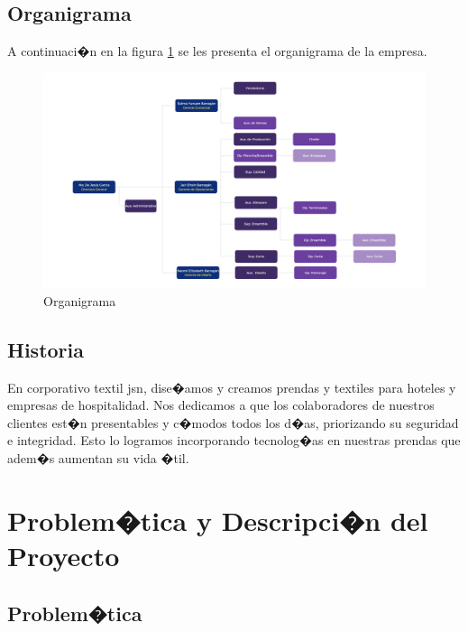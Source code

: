 \documentclass[12pt,letterpaper,spanish, xcolor=table]{report}
\begin{document}
\section{Organigrama}
A continuaci�n en la figura \ref{a2} se les presenta el organigrama de la empresa.

\begin{figure}[htp]
  \centering
  \includegraphics[width=\linewidth]{Organigrama_Jasana3.png}
  \caption{Organigrama}\label{a2}
\end{figure}

\section{Historia}
En corporativo textil jsn, dise�amos y creamos prendas y textiles para hoteles y empresas de hospitalidad.
Nos dedicamos a que los colaboradores de nuestros clientes est�n presentables y c�modos todos los d�as, priorizando su seguridad e integridad.
Esto lo logramos incorporando tecnolog�as en nuestras prendas que adem�s aumentan su vida �til.


\newpage




\chapter{Problem�tica y Descripci�n del Proyecto}
\newpage

\section{Problem�tica}
\end{document}
